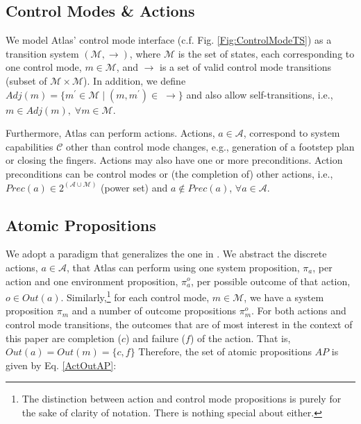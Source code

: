 
\subsection{Control Modes \& Actions}

We model Atlas' control mode interface (c.f. Fig. \ref{Fig:ControlModeTS}) as a transition system $(\mathcal{M}, \boldsymbol\rightarrow)$, where $\mathcal{M}$ is the set of states, each corresponding to one control mode, $m \in \mathcal{M}$, and $\boldsymbol\rightarrow$ is a set of valid control mode transitions (subset of $\mathcal{M} \times \mathcal{M}$).
In addition, we define $Adj(m) = \{ m^\prime \in \mathcal{M} \; | \; (m, m^\prime) \in \; \boldsymbol\rightarrow \}$ and also allow self-transitions, i.e., $m \in Adj(m), \; \forall m \in \mathcal{M}$.

Furthermore, Atlas can perform actions. Actions, $a \in \mathcal{A}$, correspond to system capabilities $\mathcal{C}$ other than control mode changes, e.g., generation of a footstep plan or closing the fingers.
Actions may also have one or more preconditions.
Action preconditions can be control modes or (the completion of) other actions, i.e., $Prec(a) \in 2^{(\mathcal{A} \cup \mathcal{M})}$ (power set) and $a \not \in Prec(a)$, $\forall a \in \mathcal{A}$.

\subsection{Atomic Propositions}

We adopt a paradigm that generalizes the one in \cite{Vasu2013ICRA}.
We abstract the discrete actions, $a \in \mathcal{A}$, that Atlas can perform using one system proposition, $\pi_a$, per action and one environment proposition, $\pi_a^o$, per possible outcome of that action, $o \in Out(a)$.
Similarly,\footnote{The distinction between action and control mode propositions is purely for the sake of clarity of notation. There is nothing special about either.}
for each control mode, $m \in \mathcal{M}$, we have a system proposition $\pi_m$ and a number of outcome propositions $\pi_m^o$.
For both actions and control mode transitions, the outcomes that are of most interest in the context of this paper are completion ($c$) and failure ($f$) of the action. That is, $Out(a) = Out(m) = \{ c, f \}$
Therefore, the set of atomic propositions $AP$ is given by Eq. \eqref{ActOutAP}:

